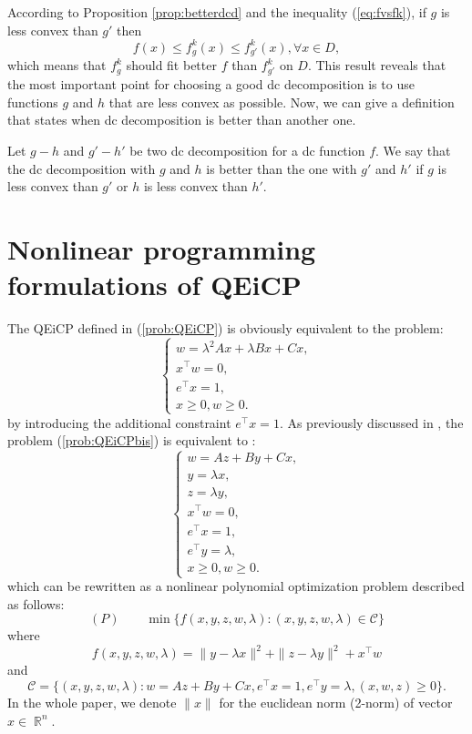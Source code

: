 \documentclass[3p]{elsarticle}
\DeclareMathOperator{\R}{\mathbb{R}}
\begin{document}
According to Proposition \ref{prop:betterdcd} and the inequality (\ref{eq:fvsfk}), if $g$ is less convex than $g'$ then \[f(x)\leq f_g^k(x)\leq f_{g'}^k(x),\forall x\in D,\]
which means that $f_g^k$ should fit better $f$ than $f_{g'}^k$ on $D$. This result reveals that the most important point for choosing a good dc decomposition is to use functions $g$ and $h$ that are less convex as possible. Now, we can give a definition that states when dc decomposition is better than another one.
\begin{df}\label{def:betterdcp}
	Let $g-h$ and $g'-h'$ be two dc decomposition for a dc function $f$. We say that the dc decomposition with $g$ and $h$ is better than the one with $g'$ and $h'$ if $g$ is less convex than $g'$ or $h$ is less convex than $h'$. 
\end{df}


\section{Nonlinear programming formulations of QEiCP}\label{sec:NLPformulations}
The QEiCP defined in (\ref{prob:QEiCP}) is obviously equivalent to the problem:
\begin{equation}\label{prob:QEiCPbis}
\left\lbrace \begin{array}{l}
w=\lambda^2Ax+\lambda Bx+Cx,\\
x^{\top}w=0,\\
e^{\top}x=1,\\
x\geq 0, w\geq 0.
\end{array}\right. 
\end{equation}
by introducing the additional constraint $e^{\top}x = 1$. As previously discussed in  \cite{Fernandes14,Niu15}, the problem (\ref{prob:QEiCPbis}) is equivalent to :
\begin{equation}\label{prob:QEiCPbisbis}
\left\lbrace \begin{array}{l}
w=Az+By+Cx,\\
y=\lambda x,\\
z=\lambda y,\\
x^{\top}w=0,\\
e^{\top}x=1,\\
e^{\top}y=\lambda,\\
x\geq 0, w\geq 0.
\end{array}\right. 
\end{equation}
which can be rewritten as a nonlinear polynomial optimization problem described as follows: 
\begin{equation}\label{prob:nlp}
(P) \qquad 
\min \{f(x,y,z,w,\lambda): (x,y,z,w,\lambda) \in \mathcal{C} \}\nonumber
\end{equation}
where \begin{equation}\label{eq:f}
f(x,y,z,w,\lambda) = \|y-\lambda x\|^2 + \|z-\lambda y\|^2 + x^{\top}w
\end{equation} and \begin{equation}\label{eq:C}
\mathcal{C} = \{(x,y,z,w,\lambda): w=Az+By+Cx, e^{\top}x=1, e^{\top}y=\lambda, (x,w,z)\geq 0\}. 
\end{equation}
In the whole paper, we denote $\|x\|$ for the euclidean norm (2-norm) of vector $x\in \R^n$.
\end{document}

